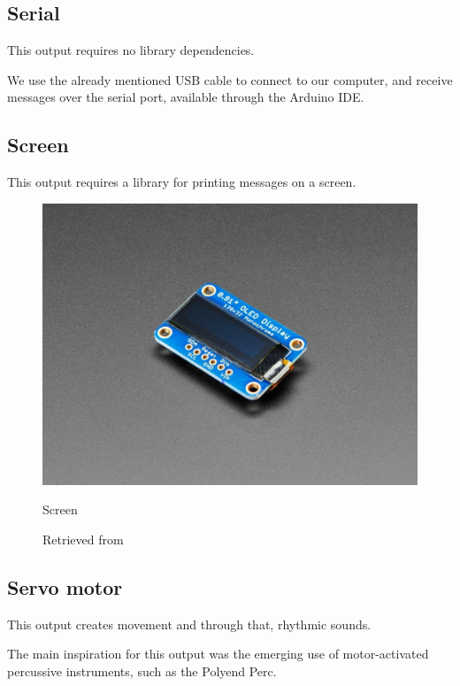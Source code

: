 \subsection{Serial}

This output requires no library dependencies.

We use the already mentioned USB cable to connect to our computer, and receive messages over the serial port, available through the Arduino IDE.

\subsection{Screen}

This output requires a library for printing messages on a screen.

\begin{figure}[ht]
  \centering
  \includegraphics[width=0.75\linewidth,height=0.25\textheight,keepaspectratio]{images/materials-adafruit-screen.jpg}
  \caption{Screen}
  \caption*{Retrieved from \cite{website-materials-adafruit-screen}}
  \label{fig:materials-adafruit-screen}
\end{figure}

\subsection{Servo motor}

This output creates movement and through that, rhythmic sounds.

The main inspiration for this output was the emerging use of motor-activated percussive instruments, such as the Polyend Perc.

